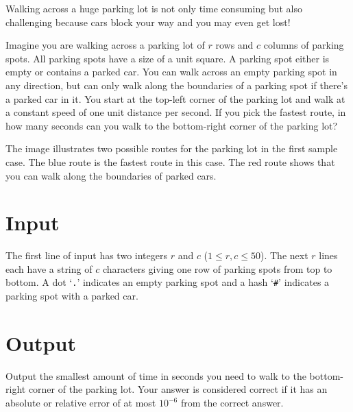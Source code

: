 
Walking across a huge parking lot is not only time consuming but also challenging because cars block your way and you may even get lost!

Imagine you are walking across a parking lot of $r$ rows and $c$ columns of parking spots.
All parking spots have a size of a unit square.
A parking spot either is empty or contains a parked car.
You can walk across an empty parking spot in any direction,
but can only walk along the boundaries of a parking spot if there's a parked car in it.
You start at the top-left corner of the parking lot and walk at a constant speed of one unit distance per second.
If you pick the fastest route, in how many seconds can you walk to the bottom-right corner of the parking lot?

The image illustrates two possible routes for the parking lot in the first sample case.
The blue route is the fastest route in this case.
The red route shows that you can walk along the boundaries of parked cars.

\section*{Input}
The first line of input has two integers $r$ and $c$ ($1\leq r,c \leq 50$).
The next $r$ lines each have a string of $c$ characters giving one row of parking spots from top to bottom.
A dot `{\tt .}' indicates an empty parking spot and a hash `{\tt \#}' indicates a parking spot with a parked car.

\section*{Output}
Output the smallest amount of time in seconds you need to walk to the bottom-right corner of the parking lot.
Your answer is considered correct if it has an absolute or relative error of at most $10^{-6}$ from the correct answer.
